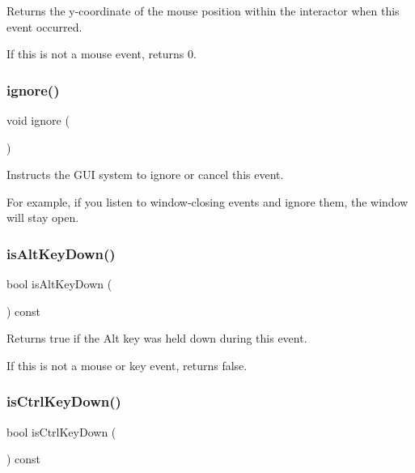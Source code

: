 Returns the y-\/coordinate of the mouse position within the interactor when this event occurred. 

If this is not a mouse event, returns 0. \mbox{\label{classGEvent_a1d8bbef538fb750723bcc8f3cbc77720}} 
\subsubsection{\texorpdfstring{ignore()}{ignore()}}
{\footnotesize\ttfamily void ignore (\begin{DoxyParamCaption}{ }\end{DoxyParamCaption})\hspace{0.3cm}{\ttfamily [virtual]}}



Instructs the G\+UI system to ignore or cancel this event. 

For example, if you listen to window-\/closing events and ignore them, the window will stay open. \mbox{\label{classGEvent_ac5cfd7d64f7bc3d43c4ce4326f213ab5}} 
\subsubsection{\texorpdfstring{is\+Alt\+Key\+Down()}{isAltKeyDown()}}
{\footnotesize\ttfamily bool is\+Alt\+Key\+Down (\begin{DoxyParamCaption}{ }\end{DoxyParamCaption}) const\hspace{0.3cm}{\ttfamily [virtual]}}



Returns {\ttfamily true} if the Alt key was held down during this event. 

If this is not a mouse or key event, returns false. \mbox{\label{classGEvent_a32ebd8661e615f5fbe15322b3423e06c}} 
\subsubsection{\texorpdfstring{is\+Ctrl\+Key\+Down()}{isCtrlKeyDown()}}
{\footnotesize\ttfamily bool is\+Ctrl\+Key\+Down (\begin{DoxyParamCaption}{ }\end{DoxyParamCaption}) const\hspace{0.3cm}{\ttfamily [virtual]}}



